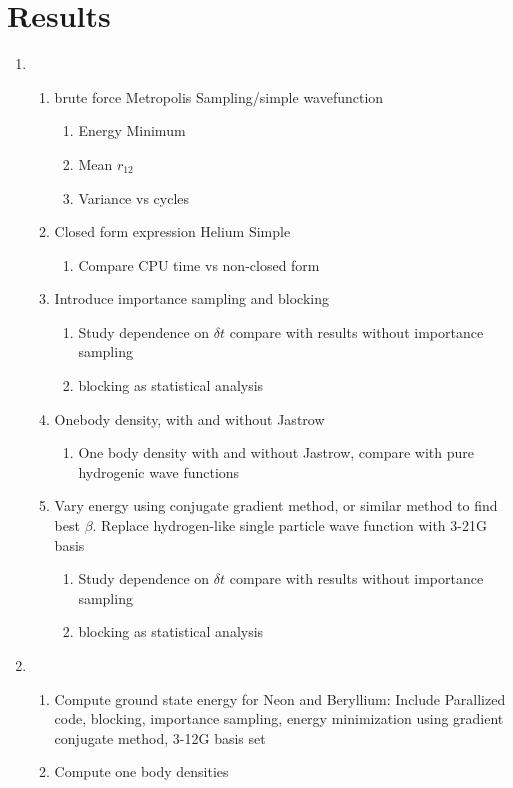 \documentclass[11pt]{article}
\begin{document}
\section{Results}

\begin{enumerate}
\item
	\begin{enumerate}
		\item brute force Metropolis Sampling/simple wavefunction
			\begin{enumerate}
				\item Energy Minimum
				\item Mean  \(r_{12} \)
				\item Variance vs cycles
			\end{enumerate}
		\item Closed form expression Helium Simple
			\begin{enumerate}
				\item Compare CPU time vs non-closed form
			\end{enumerate}
		\item Introduce importance sampling and blocking
			\begin{enumerate}
				\item Study dependence on \(\delta t\) compare with results without importance sampling
				\item blocking as statistical analysis
			\end{enumerate}

		\item Onebody density, with and without Jastrow
			\begin{enumerate}
				\item One body density with and without Jastrow, compare with pure hydrogenic wave functions
			\end{enumerate}

		\item Vary energy using conjugate gradient method, or similar method to find best \(\beta\). Replace hydrogen-like single particle wave function with 3-21G basis
			\begin{enumerate}
				\item Study dependence on \(\delta t\) compare with results without importance sampling
				\item blocking as statistical analysis
			\end{enumerate}
	\end{enumerate}


\item 
	\begin{enumerate}
		\item Compute ground state energy for Neon and Beryllium: Include Parallized code, blocking, importance sampling, energy minimization using gradient conjugate method, 3-12G basis set
		\item Compute one body densities
	\end{enumerate}


\end{enumerate}
\end{document}
